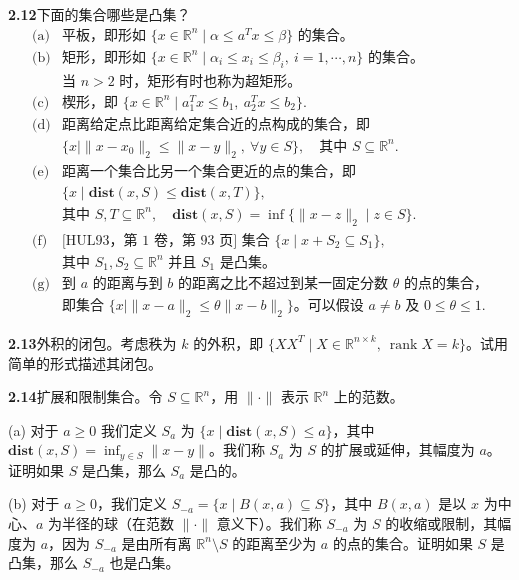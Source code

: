 \documentclass[UTF8, 12pt, fontset=fandol, oneside]{ctexart}
\begin{document}
\noindent\textbf{2.12}\quad 下面的集合哪些是凸集？
\[
  \begin{array}{ll}
  \text{(a)} & \text{平板，即形如 }\{x\in\mathbb{R}^n\mid \alpha\le a^Tx\le\beta\}\text{ 的集合。}\\[0.3em]
  \text{(b)} & \text{矩形，即形如 }\{x\in\mathbb{R}^n\mid \alpha_i\le x_i\le\beta_i,\ i=1,\cdots,n\}\text{ 的集合。}\\
  & \text{当 }n>2\text{ 时，矩形有时也称为超矩形。}\\[0.3em]
  \text{(c)} & \text{楔形，即 }\{x\in\mathbb{R}^n\mid a_1^Tx\le b_1,\ a_2^Tx\le b_2\}.\\[0.3em]
  \text{(d)} & \text{距离给定点比距离给定集合近的点构成的集合，即}\\
  & \{x\mid \|x-x_0\|_2\le\|x-y\|_2,\ \forall y\in S\},\quad \text{其中 }S\subseteq\mathbb{R}^n.\\[0.3em]
  \text{(e)} & \text{距离一个集合比另一个集合更近的点的集合，即}\\
  & \{x\mid \mathbf{dist}(x,S)\le\mathbf{dist}(x,T)\},\\
  & \text{其中 }S,T\subseteq\mathbb{R}^n,\quad
    \mathbf{dist}(x,S)=\inf\{\|x-z\|_2\mid z\in S\}.\\[0.3em]
  \text{(f)} & \text{[HUL93，第 1 卷，第 93 页] 集合 }\{x\mid x+S_2\subseteq S_1\},\\
  & \text{其中 }S_1,S_2\subseteq\mathbb{R}^n\text{ 并且 }S_1\text{ 是凸集。}\\[0.3em]
  \text{(g)} & \text{到 }a\text{ 的距离与到 }b\text{ 的距离之比不超过到某一固定分数 }\theta\text{ 的点的集合，}\\
  & \text{即集合 }\{x\mid \|x-a\|_2\le\theta\|x-b\|_2\}\text{。可以假设 }a\ne b\text{ 及 }0\le\theta\le1.
  \end{array}
\]

\noindent\textbf{2.13}\quad 外积的闭包。考虑秩为 $k$ 的外积，即 $\{XX^T\mid X\in\mathbb{R}^{n\times k},\ \operatorname{rank}X=k\}$。试用简单的形式描述其闭包。

\noindent\textbf{2.14}\quad 扩展和限制集合。令 $S\subseteq\mathbb{R}^n$，用 $\|\cdot\|$ 表示 $\mathbb{R}^n$ 上的范数。

\noindent(a) 对于 $a\ge0$ 我们定义 $S_a$ 为 $\{x\mid \mathbf{dist}(x,S)\le a\}$，其中 $\mathbf{dist}(x,S)=\inf_{y\in S}\|x-y\|$。我们称 $S_a$ 为 $S$ 的扩展或延伸，其幅度为 $a$。证明如果 $S$ 是凸集，那么 $S_a$ 是凸的。

\noindent(b) 对于 $a\ge0$，我们定义 $S_{-a}=\{x\mid B(x,a)\subseteq S\}$，其中 $B(x,a)$ 是以 $x$ 为中心、$a$ 为半径的球（在范数 $\|\cdot\|$ 意义下）。我们称 $S_{-a}$ 为 $S$ 的收缩或限制，其幅度为 $a$，因为 $S_{-a}$ 是由所有离 $\mathbb{R}^n\setminus S$ 的距离至少为 $a$ 的点的集合。证明如果 $S$ 是凸集，那么 $S_{-a}$ 也是凸集。
\end{document}
